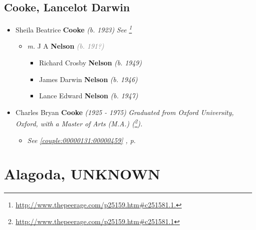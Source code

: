\documentclass[10pt, openany]{book}
\begin{document}
\chapter{Cooke, Lancelot Darwin}
\label{00002518}
\textcolor{slmaroon}{\textit{}}
\begin{itemize}
\item{Sheila Beatrice \textbf{Cooke} \textcolor{slorange}{\textit{(b. 1923)}} \textcolor{slmaroon}{\textit{See \footnote{\url{http://www.thepeerage.com/p25159.htm\#c251581.1.}}}}
\begin{itemize}
\item{\textit{m.} J A \textbf{Nelson} \textcolor{gray}{\textit{(b. 191?)}}   \label{couple:00002520:00002521} \begin{itemize}
\item{Richard Crosby \textbf{Nelson} \textcolor{slorange}{\textit{(b. 1949)}}
  }
\item{James Darwin \textbf{Nelson} \textcolor{slorange}{\textit{(b. 1946)}}
  }
\item{Lance Edward \textbf{Nelson} \textcolor{slorange}{\textit{(b. 1947)}}
  }
\end{itemize}}
\end{itemize}
  }
\item{Charles Bryan \textbf{Cooke} \textcolor{slorange}{\textit{(1925 - 1975)}} \textcolor{slmaroon}{\textit{Graduated from Oxford University, Oxford, with a Master of Arts (M.A.) (\footnote{\url{http://www.thepeerage.com/p25159.htm\#c251581.1}}).}}
\begin{itemize}
\item{\textcolor{slteal}{\textit{See  \autoref{couple:00000131:00000459} \textit{, p. \pageref{couple:00000131:00000459} }}}}
\end{itemize}
  }
\end{itemize}
  
\part{Alagoda, UNKNOWN}
\end{document}
